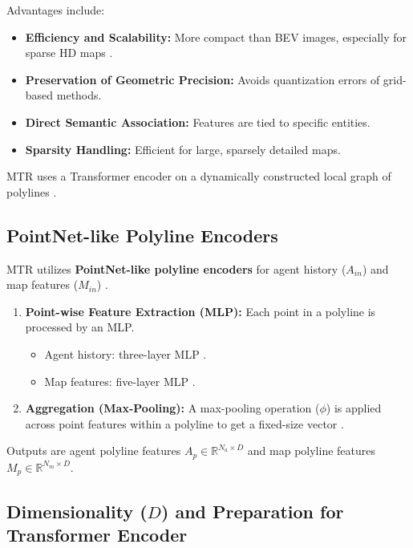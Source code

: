 Advantages include:
\begin{itemize}
    \item \textbf{Efficiency and Scalability:} More compact than BEV images, especially for sparse HD maps \cite{VectorNet2020}.
    \item \textbf{Preservation of Geometric Precision:} Avoids quantization errors of grid-based methods.
    \item \textbf{Direct Semantic Association:} Features are tied to specific entities.
    \item \textbf{Sparsity Handling:} Efficient for large, sparsely detailed maps.
\end{itemize}
MTR uses a Transformer encoder on a dynamically constructed local graph of polylines \cite{Shi2022MTR}.

\subsection{PointNet-like Polyline Encoders}
\label{subsec:pointnet_encoders}

MTR utilizes \textbf{PointNet-like polyline encoders} for agent history ($A_{in}$) and map features ($M_{in}$) \cite{Shi2022MTR, Shi2022MTR_A}.
\begin{enumerate}
    \item \textbf{Point-wise Feature Extraction (MLP):} Each point in a polyline is processed by an MLP.
    \begin{itemize}
        \item Agent history: three-layer MLP \cite{Shi2022MTR}.
        \item Map features: five-layer MLP \cite{Shi2022MTR}.
    \end{itemize}
    \item \textbf{Aggregation (Max-Pooling):} A max-pooling operation ($\phi$) is applied across point features within a polyline to get a fixed-size vector \cite{Shi2022MTR}.
\end{enumerate}
Outputs are agent polyline features $A_p \in \mathbb{R}^{N_a \times D}$ and map polyline features $M_p \in \mathbb{R}^{N_m \times D}$.

\subsection{Dimensionality ($D$) and Preparation for Transformer Encoder}
\label{subsec:dimensionality_prep}

